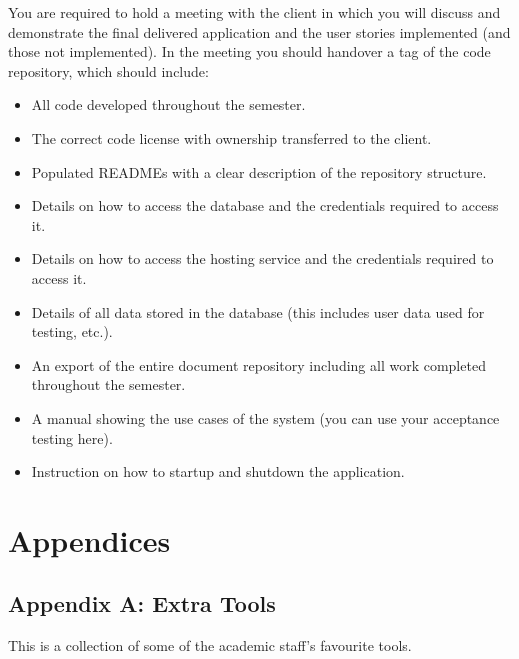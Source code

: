 \documentclass[letterpaper,10pt,english]{jupyterBook}
\begin{document}
\sphinxAtStartPar
You are required to hold a meeting with the client in which you will discuss and demonstrate the final delivered
application and the user stories implemented (and those not implemented).
In the meeting you should handover a tag of the code repository, which should include:
\begin{itemize}
\item {} 
\sphinxAtStartPar
All code developed throughout the semester.

\item {} 
\sphinxAtStartPar
The correct code license with ownership transferred to the client.

\item {} 
\sphinxAtStartPar
Populated READMEs with a clear description of the repository structure.

\item {} 
\sphinxAtStartPar
Details on how to access the database and the credentials required to access it.

\item {} 
\sphinxAtStartPar
Details on how to access the hosting service and the credentials required to access it.

\item {} 
\sphinxAtStartPar
Details of all data stored in the database (this includes user data used for testing, etc.).

\item {} 
\sphinxAtStartPar
An export of the entire document repository including all work completed throughout the semester.

\item {} 
\sphinxAtStartPar
A manual showing the use cases of the system (you can use your acceptance testing here).

\item {} 
\sphinxAtStartPar
Instruction on how to start\sphinxhyphen{}up and shutdown the application.

\end{itemize}


\part{Appendices}


\chapter{Appendix A: Extra Tools}
\label{\detokenize{appendices/appendix_a/extra_tools:appendix-a-extra-tools}}\label{\detokenize{appendices/appendix_a/extra_tools::doc}}
\sphinxAtStartPar
This is a collection of some of the academic staff’s favourite tools.
\end{document}
